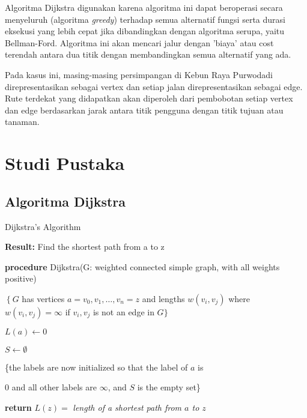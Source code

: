 \documentclass[10pt, conference]{IEEEtran}
\begin{document}
Algoritma Dijkstra digunakan karena algoritma ini dapat beroperasi secara menyeluruh (algoritma \emph{greedy}) terhadap semua alternatif fungsi serta durasi eksekusi yang lebih cepat jika dibandingkan dengan algoritma serupa, yaitu Bellman-Ford. Algoritma ini akan mencari jalur dengan ’biaya’ atau cost terendah antara dua titik dengan membandingkan semua alternatif yang ada.

Pada kasus ini, masing-masing persimpangan di Kebun Raya Purwodadi direpresentasikan sebagai vertex dan setiap jalan direpresentasikan sebagai edge. Rute terdekat yang didapatkan akan diperoleh dari pembobotan setiap vertex dan edge berdasarkan jarak antara titik pengguna dengan titik tujuan atau tanaman.

\section{Studi Pustaka}
\subsection{Algoritma Dijkstra}

\begin{algorithm}

\caption{Dijkstra’s Algorithm}
\label{alg:two}

\textbf{Result:} Find the shortest path from a to $\mathrm{z}$

\textbf{procedure} Dijkstra(G: weighted connected simple graph, with all weights positive)

$\left\{G\right.$ has vertices $a=v_{0}, v_{1}, \ldots, v_{n}=z$ and lengths $w\left(v_{i}, v_{j}\right)$ where $w\left(v_{i}, v_{j}\right)=\infty$ if $v_{i}, v_{j}$ is not an edge in $G\}$


$L(a)\gets0$

$S\gets\emptyset$

\{the labels are now initialized so that the label of $a$ is

0 and all other labels are $\infty$, and $S$ is the empty set\}

\textbf{return} $L(z) =$ \emph{length of a shortest path from $a$ to $z$}
\end{algorithm}
\end{document}

